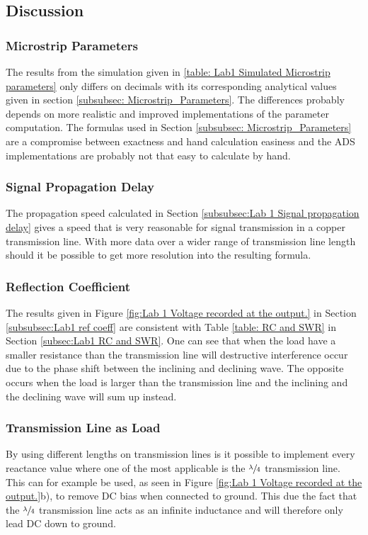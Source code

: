 \documentclass[report.tex]{subfiles}
\begin{document}
\subsection{Discussion}
\subsubsection{Microstrip Parameters}
The results from the simulation given in \ref{table: Lab1 Simulated Microstrip parameters} only differs on decimals with its corresponding analytical values given in section \ref{subsubsec: Microstrip_Parameters}. The differences probably depends on more realistic and improved implementations of the parameter computation. The formulas used in Section \ref{subsubsec: Microstrip_Parameters} are a compromise between exactness and hand calculation easiness and the ADS implementations are probably not that easy to calculate by hand.
\subsubsection{Signal Propagation Delay}
The propagation speed calculated in Section \ref{subsubsec:Lab 1 Signal propagation delay} gives a speed that is very reasonable for signal transmission in a copper transmission line. With more data over a wider range of transmission line length should it be possible to get more resolution into the resulting formula.
\subsubsection{Reflection Coefficient}
The results given in Figure \ref{fig:Lab 1 Voltage recorded at the output.} in Section \ref{subsubsec:Lab1 ref coeff} are consistent with Table \ref{table: RC and SWR} in Section \ref{subsec:Lab1 RC and SWR}. One can see that when the load have a smaller resistance than the transmission line will destructive interference occur due to the phase shift between the inclining and declining wave. The opposite occurs when the load is larger than the transmission line and the inclining and the declining wave will sum up instead.
\subsubsection{Transmission Line as Load}
By using different lengths on transmission lines is it possible to implement every reactance value where one of the most applicable is the $\sfrac{\lambda}{4}$ transmission line. This can for example be used, as seen in Figure \ref{fig:Lab 1 Voltage recorded at the output.}b), to remove DC bias when connected to ground. This due the fact that the  $\sfrac{\lambda}{4}$ transmission line acts as an infinite inductance and will therefore only lead DC down to ground.
\end{document}
